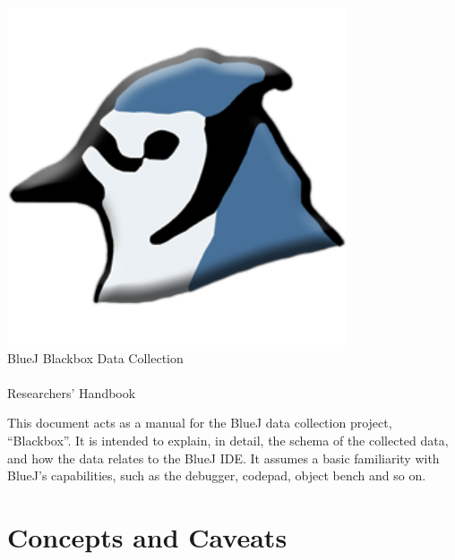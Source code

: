 \documentclass{report}
\begin{document}
\begin{titlepage}
  \begin{center}
    \includegraphics[width=10cm]{../../lib/images/bluej-icon-256.png}\\
    \huge BlueJ Blackbox Data Collection\\~\\Researchers' Handbook
  \end{center}
\end{titlepage}

This document acts as a manual for the BlueJ data collection project,
``Blackbox''.  It is intended to explain, in detail, the schema of the
collected data, and how the data relates to the BlueJ IDE.  It assumes a basic
familiarity with BlueJ's capabilities, such as the debugger, codepad, object
bench and so on.

\begingroup
\let\clearpage\relax
\tableofcontents
\endgroup

\listoftables

\begin{table}
\caption[Possible \lstinline!master_events.name! values]{List of different
  values allowed for the \lstinline!name! column in the \lstinline!master_events! column, with
  links to sections in which that event is described.}
\label{tab:event_names}
\begin{center}
\end{center}
\end{table}

\chapter{Concepts and Caveats}
\end{document}
